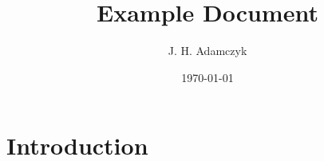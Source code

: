 \documentclass{article}
\title{Example Document}
\author{J. H. Adamczyk}
\date{\today}
\theoremstyle{plain}
\theoremstyle{definition}
\theoremstyle{remark}
\begin{document}
\maketitle

\section{Introduction}



% 
\end{document}
